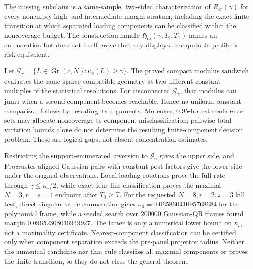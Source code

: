 The missing subclaim is a same-sample, two-sided characterization of \(R_{\mathrm{or}}(\gamma)\) for every nonempty high- and intermediate-margin stratum, including the exact finite transition at which separated loading components can be classified within the noncoverage budget.  The construction handle \(\mathfrak H_{\mathrm{or}}(\gamma;T_0,T_1)\) names an enumeration but does not itself prove that any displayed computable profile is risk-equivalent.

Let \(\mathcal G_\gamma=\{L\in\operatorname{Gr}(r,N):\kappa_s(L)\ge\gamma\}\).  The proved compact modulus sandwich evaluates the same sparse-compatible geometry at two different constant multiples of the statistical resolutions.  For disconnected \(\mathcal G_\gamma\), that modulus can jump when a second component becomes reachable.  Hence no uniform constant comparison follows by rescaling its arguments.  Moreover, \(0.95\)-honest confidence sets may allocate noncoverage to component misclassification; pairwise total-variation bounds alone do not determine the resulting finite-component decision problem.  These are logical gaps, not absent concentration estimates.

Restricting the support-enumerated inversion to \(\mathcal G_\gamma\) gives the upper side, and Procrustes-aligned Gaussian pairs with constant post factors give the lower side under the original observations.  Local loading rotations prove the full rate through \(\gamma\le\kappa_\star/2\), while exact four-line classification proves the maximal \(N=3,r=s=1\) endpoint after \(T_0\ge\overline T\).  For the requested \(N=8,r=2,s=3\) kill test, direct singular-value enumeration gives \(\kappa_3=0.06586041095768684\) for the polynomial frame, while a seeded search over \(200000\) Gaussian-QR frames found margin \(0.09652308016949927\).  The latter is only a numerical lower bound on \(\kappa_\star\), not a maximality certificate.  Nearest-component classification can be certified only when component separation exceeds the pre-panel projector radius.  Neither the numerical candidate nor that rule classifies all maximal components or proves the finite transition, so they do not close the general theorem.

